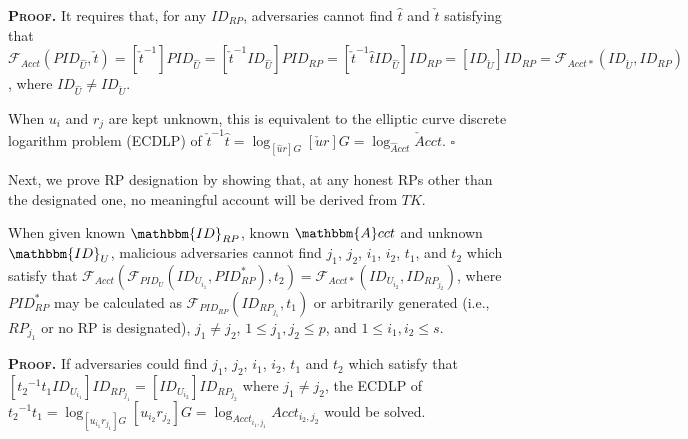 \noindent\textbf{\textsc{Proof.}}
It requires that, for any $ID_{RP}$, adversaries cannot find $\hat{t}$ and $\check{t}$ satisfying that $\mathcal{F}_{Acct}(PID_{\hat{U}}, \check{t}) = [\check{t}^{-1}]PID_{\hat{U}} = [\check{t}^{-1}ID_{\hat{U}}]PID_{RP}
= [\check{t}^{-1}\hat{t}ID_{\hat{U}}]ID_{RP}
    = [ID_{\check{U}}]ID_{RP} = \mathcal{F}_{Acct\ast}(ID_{\check{U}}, ID_{RP})$,
where $ID_{\hat{U}} \neq ID_{\check{U}}$.

When $u_{i}$ and $r_{j}$ are kept unknown, this is equivalent to the elliptic curve discrete logarithm problem (ECDLP) of $\check{t}^{-1}\hat{t} = \log_{[\hat{u}r]G}{[\check{u}r]G} = \log_{\hat{A}cct}{\check{A}cct}$.
\hfill $\square$

\vspace{1.5mm}

Next,
we prove RP designation by showing that,
    at any honest RPs other than the designated one, no meaningful account will be derived from $TK$.


\vspace{1.5mm}
\begin{thm}[RP Designation]
When given known $\mathbbm{ID}_{RP}$, known $\mathbbm{A}cct$ and unknown $\mathbbm{ID}_U$,
 malicious adversaries cannot find ${j_1}$, ${j_2}$, ${i_1}$, ${i_2}$, $t_1$, and $t_2$ which satisfy that $\mathcal{F}_{Acct}(\mathcal{F}_{PID_U}(ID_{U_{i_1}}, PID_{RP}^{*}), t_2) = \mathcal{F}_{Acct\ast}(ID_{U_{i_2}}, ID_{RP_{j_2}})$,
where $PID_{RP}^{*}$ may be calculated as $\mathcal{F}_{PID_{RP}}(ID_{RP_{j_1}}, t_1)$
    or arbitrarily generated (i.e., $RP_{j_1}$ or no RP is designated),
    ${j_1} \neq {j_2}$, $1 \leq j_1, j_2 \leq p$, and $1 \leq i_1, i_2 \leq s$.
\label{thm-rp-designation}
\end{thm}


\noindent\textbf{\textsc{Proof.}} 
If adversaries could find ${j_1}$, ${j_2}$, ${i_1}$, ${i_2}$, $t_1$ and $t_2$ which satisfy that $[{t_2}^{-1}t_1ID_{U_{i_1}}]ID_{RP_{j_1}} = [ID_{U_{i_2}}]ID_{RP_{j_2}}$
 where ${j_1} \neq {j_2}$,
 the ECDLP of ${t_2}^{-1}t_1 = \log_{[{u_{i_1}}{r_{j_1}}]G}{[{u_{i_2}}{r_{j_2}}]G}
 = \log_{Acct_{i_1,j_1}}{Acct_{i_2,j_2}}$ would be solved.

